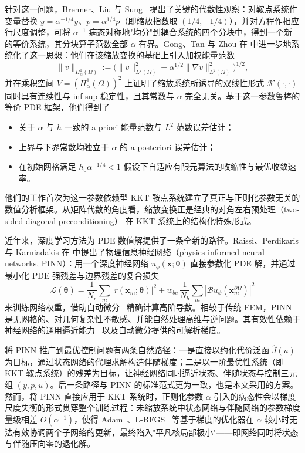 \documentclass{xmu}
\theoremstyle{plain}
\theoremstyle{remark}
\begin{document}
针对这一问题，Brenner、Liu 与 Sung~\cite{4} 提出了关键的代数性观察：对鞍点系统作变量替换 $\bar y = \alpha^{-1/4}y$、$\bar p = \alpha^{1/4}p$（即缩放指数取 $(1/4,-1/4)$），并对方程作相应行尺度调整，可将 $\alpha^{-1}$ 病态对称地"均分"到耦合系统的四个分块中，得到一个新的等价系统，其分块算子范数全部 $\alpha$-有界。Gong、Tan 与 Zhou 在 \cite{3} 中进一步地系统化了这一思想：他们在该缩放变换的基础上引入加权能量范数
\[
\|v\|_{H_\alpha^1(\Omega)} := \bigl(\|v\|_{L^2(\Omega)}^2 + \alpha^{1/2}\|\nabla v\|_{L^2(\Omega)}^2\bigr)^{1/2},
\]
并在乘积空间 $V = (H_\alpha^1(\Omega))^2$ 上证明了缩放系统所诱导的双线性形式 $\mathcal{K}(\cdot,\cdot)$ 同时具有连续性与 inf-sup 稳定性，且其常数与 $\alpha$ 完全无关。基于这一参数鲁棒的等价 PDE 框架，他们得到了
\begin{itemize}
  \item 关于 $\alpha$ 与 $h$ 一致的 a priori 能量范数与 $L^2$ 范数误差估计；
  \item 上界与下界常数均独立于 $\alpha$ 的 a posteriori 误差估计；
  \item 在初始网格满足 $h_0\alpha^{-1/4}<1$ 假设下自适应有限元算法的收缩性与最优收敛速率。
\end{itemize}
他们的工作首次为这一参数依赖型 KKT 鞍点系统建立了真正与正则化参数无关的数值分析框架。从矩阵代数的角度看，缩放变换正是经典的对角左右预处理（two-sided diagonal preconditioning）\cite{33} 在 KKT 系统上的结构化特殊形式。

\label{subsec:intro-pinn}

近年来，深度学习方法为 PDE 数值解提供了一条全新的路径。Raissi、Perdikaris 与 Karniadakis 在 \cite{21} 中提出了物理信息神经网络（physics-informed neural networks, PINN）：用一个深度神经网络 $u_\phi(\mathbf{x};\boldsymbol{\theta})$ 直接参数化 PDE 解，并通过最小化 PDE 强残差与边界残差的复合损失
\[
\mathcal{L}(\boldsymbol{\theta}) = \frac{1}{N_r}\sum_{m}|r(\mathbf{x}_m;\boldsymbol{\theta})|^2 + w_{bc}\,\frac{1}{N_b}\sum_{m}|\mathcal{B}u_\phi(\mathbf{x}_m^{\partial\Omega})|^2
\]
来训练网络权重，借助自动微分~\cite{22} 精确计算高阶导数。相较于传统 FEM，PINN 是无网格的、对几何复杂性不敏感、并能自然处理高维与逆问题。其有效性依赖于神经网络的通用逼近能力~\cite{28} 以及自动微分提供的可解析梯度。

将 PINN 推广到最优控制问题有两条自然路径：一是直接以约化代价泛函 $\hat J(\bar u)$ 为目标，通过状态网络的代理求解构造伴随梯度；二是以一阶最优性系统（即 KKT 鞍点系统）的残差为目标，让神经网络同时逼近状态、伴随状态与控制三元组 $(\bar y, \bar p, \bar u)$。后一条路径与 PINN 的标准范式更为一致，也是本文采用的方案。然而，将 PINN 直接应用于 KKT 系统时，正则化参数 $\alpha$ 引入的病态性会以梯度尺度失衡的形式贯穿整个训练过程：未缩放系统中状态网络与伴随网络的参数梯度量级相差 $O(\alpha^{-1})$，使得 Adam~\cite{25}、L-BFGS~\cite{26} 等基于梯度的优化器在 $\alpha$ 较小时无法有效协调两个子网络的更新，最终陷入"平凡核局部极小"——即网络同时将状态与伴随压向零的退化解。
\end{document}
